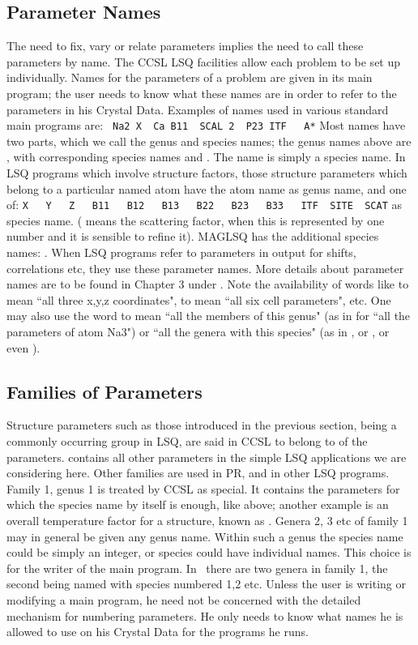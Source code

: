 \subsection{Parameter Names}
% 
The need to fix, vary or relate parameters implies the need to call
these parameters by name.  The CCSL LSQ facilities allow each problem to
be set up individually.  Names for the parameters of a problem are
given in its main program;  the user needs to know what these names are
in order to refer to the parameters in his Crystal Data.
\p
Examples of names used in various standard main programs are:
\ssp
\verb| Na2 X  Ca B11  SCAL 2  P23 ITF   A*|
\ssp 
Most names have two parts, which we call the genus and species names;  the
genus names above are , with corresponding
species names  and .  The name  
is simply a species name.
\p 
In LSQ programs which involve structure factors,
those structure parameters which belong to a particular named atom
have the atom name as genus name, and one of:
\ssp 
\verb|X   Y   Z   B11   B12   B13   B22   B23   B33   ITF  SITE  SCAT|
\ssp 
as species name.  
( means the scattering factor, when this is represented 
by one number and it is sensible to refine it).
\p
MAGLSQ has the additional species names:
\ssp
{}.
\p
When LSQ programs refer to parameters in output for shifts, correlations etc,
they use these parameter names.
\p 
More details about parameter
names are to be found in Chapter 3 under .  
Note the availability
of words like  to mean ``all three x,y,z coordinates", 
 to mean ``all six
cell parameters", etc.  One may also use the word  
to mean ``all the members
of this genus" (as in  for ``all the parameters of atom Na3")
 or ``all
the genera with this species" (as in , or , or even 
).
%
\subsection{Families of Parameters}
% 
Structure parameters such as those introduced in the previous section,
being a commonly occurring group in LSQ, are said in CCSL to belong to 
 of the parameters.   contains all other
parameters in the simple LSQ applications we are considering here.  Other
families are used in PR, and in other LSQ programs.
\p 
Family 1, genus 1 is treated by CCSL as special.  It
contains the parameters for which the species name by itself is enough,
like  above;  another example is an overall temperature factor for a
structure, known as .
\p 
Genera 2, 3 etc of family 1 may in general be given any genus name.  Within
such a genus the species name could be simply an integer, or species could have 
individual names.  This choice is
for the writer of the main program.  In \ there are two genera in
family 1, the second being named  with species numbered 1,2 etc.
\p 
Unless the user is writing or modifying a main program, he need not be
concerned with the detailed mechanism for numbering parameters.  He only
needs to know what names he is allowed to use on his Crystal Data
for the programs he runs.
\p 
